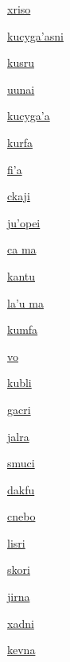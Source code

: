 {\hyperlink{val:xriso}{xriso}}{}{}{}

{\hyperlink{val:kucygahasni}{kucyga'asni}}{}{}{}

{\hyperlink{val:kusru}{kusru}}{}{}{}

{\hyperlink{val:uunai}{uunai}}{}{}{}

{\hyperlink{val:kucygaha}{kucyga'a}}{}{}{}

{\hyperlink{val:kurfa}{kurfa}}{}{}{}

{\hyperlink{val:fiha}{fi'a}}{}{}{}

{\hyperlink{val:ckaji}{ckaji}}{}{}{}

{\hyperlink{val:juhopei}{ju'opei}}{}{}{}

{\hyperlink{val:ca ma}{ca ma}}{}{}{}

{\hyperlink{val:kantu}{kantu}}{}{}{}

{\hyperlink{val:lahu ma}{la'u ma}}{}{}{}

{\hyperlink{val:kumfa}{kumfa}}{}{}{}

{\hyperlink{val:vo}{vo}}{}{}{}

{\hyperlink{val:kubli}{kubli}}{}{}{}

{\hyperlink{val:gacri}{gacri}}{}{}{}

{\hyperlink{val:jalra}{jalra}}{}{}{}

{\hyperlink{val:smuci}{smuci}}{}{}{}

{\hyperlink{val:dakfu}{dakfu}}{}{}{}

{\hyperlink{val:cnebo}{cnebo}}{}{}{}

{\hyperlink{val:lisri}{lisri}}{}{}{}

{\hyperlink{val:skori}{skori}}{}{}{}

{\hyperlink{val:jirna}{jirna}}{}{}{}

{\hyperlink{val:xadni}{xadni}}{}{}{}

{\hyperlink{val:kevna}{kevna}}{}{}{}

